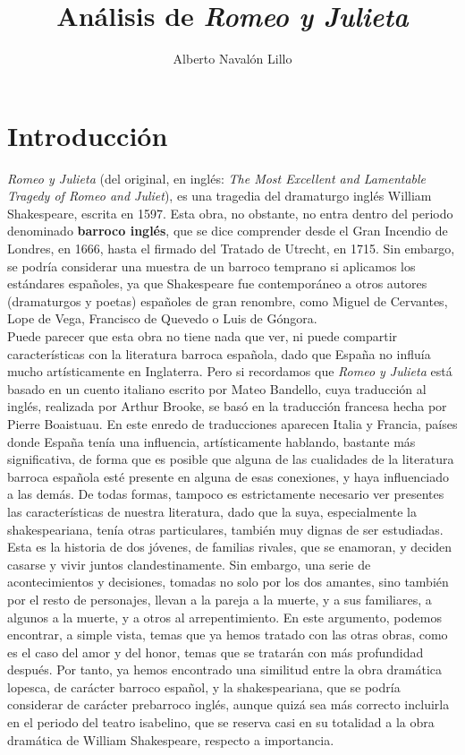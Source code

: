 \documentclass[12pt,a4paper]{article}
\title{\textbf{Análisis de \textit{Romeo y Julieta}}}
\author{Alberto Navalón Lillo}
\begin{document}
\maketitle
\tableofcontents

\section{Introducción}

\textit{Romeo y Julieta} (del original, en inglés: \textit{The Most Excellent and Lamentable Tragedy of Romeo and Juliet}), es una tragedia del dramaturgo inglés William Shakespeare, escrita en 1597. Esta obra, no obstante, no entra dentro del periodo denominado \textbf{barroco inglés}, que se dice comprender desde el Gran Incendio de Londres, en 1666, hasta el firmado del Tratado de Utrecht, en 1715. Sin embargo, se podría considerar una muestra de un barroco temprano si aplicamos los estándares españoles, ya que Shakespeare fue contemporáneo a otros autores (dramaturgos y poetas) españoles de gran renombre, como Miguel de Cervantes, Lope de Vega, Francisco de Quevedo o Luis de Góngora.\\

Puede parecer que esta obra no tiene nada que ver, ni puede compartir características con la literatura barroca española, dado que España no influía mucho artísticamente en Inglaterra. Pero si recordamos que \textit{Romeo y Julieta} está basado en un cuento italiano escrito por Mateo Bandello, cuya traducción al inglés, realizada por Arthur Brooke, se basó en la traducción francesa hecha por Pierre Boaistuau. En este enredo de traducciones aparecen Italia y Francia, países donde España tenía una influencia, artísticamente hablando, bastante más significativa, de forma que es posible que alguna de las cualidades de la literatura barroca española esté presente en alguna de esas conexiones, y haya influenciado a las demás. De todas formas, tampoco es estrictamente necesario ver presentes las características de nuestra literatura, dado que la suya, especialmente la shakespeariana, tenía otras particulares, también muy dignas de ser estudiadas.\\

Esta es la historia de dos jóvenes, de familias rivales, que se enamoran, y deciden casarse y vivir juntos clandestinamente. Sin embargo, una serie de acontecimientos y decisiones, tomadas no solo por los dos amantes, sino también por el resto de personajes, llevan a la pareja a la muerte, y a sus familiares, a algunos a la muerte, y a otros al arrepentimiento. En este argumento, podemos encontrar, a simple vista, temas que ya hemos tratado con las otras obras, como es el caso del amor y del honor, temas que se tratarán con más profundidad después. Por tanto, ya hemos encontrado una similitud entre la obra dramática lopesca, de carácter barroco español, y la shakespeariana, que se podría considerar de carácter prebarroco inglés, aunque quizá sea más correcto incluirla en el periodo del teatro isabelino, que se reserva casi en su totalidad a la obra dramática de William Shakespeare, respecto a importancia.\\
\end{document}
